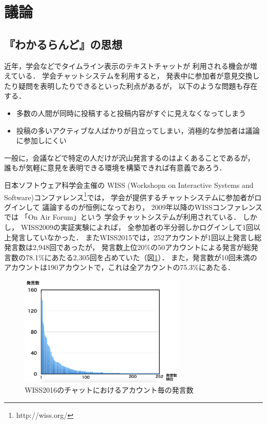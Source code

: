 \section{議論}

\subsection{『わかるらんど』の思想}

近年，学会などでタイムライン表示のテキストチャットが
利用される機会が増えている\cite{wiss_challenge}．
学会チャットシステムを利用すると，
発表中に参加者が意見交換したり疑問を表明したりできるといった利点があるが，
以下のような問題も存在する．

\begin{itemize}
\item 多数の人間が同時に投稿すると投稿内容がすぐに見えなくなってしまう
\item 投稿の多いアクティブな人ばかりが目立ってしまい，消極的な参加者は議論に参加しにくい
\end{itemize}

一般に，会議などで特定の人だけが沢山発言するのはよくあることであるが，
誰もが気軽に意見を表明できる環境を構築できれば有意義であろう．

日本ソフトウェア科学会主催の
WISS (Workshopn on Interactive Systems and Software)コンファレンス\footnote{
  \textsf{http://wiss.org/}
}では，
学会が提供するチャットシステムに参加者がログインして
議論するのが恒例になっており，
2009年以降のWISSコンファレンスでは
「On Air Forum」\cite{OnAirForum}という
学会チャットシステムが利用されている．
%
しかし，
WISS2009の実証実験\cite{nishida2011}によれば，
全参加者の半分弱しかログインして1回以上発言していなかった．
またWISS2015では，252アカウントが1回以上発言し総発言数は2,948回であったが，
発言数上位20\%の50アカウントによる発言が総発言数の78.1\%にあたる2,305回を占めていた（図\ref{wisschat}）．
また，発言数が10回未満のアカウントは190アカウントで，これは全アカウントの75.3\%にあたる．

\begin{figure}[h]
\centering\includegraphics[width=8cm]{images/wisschat.png}
\caption{WISS2016のチャットにおけるアカウント毎の発言数}
\label{wisschat}
\end{figure}

